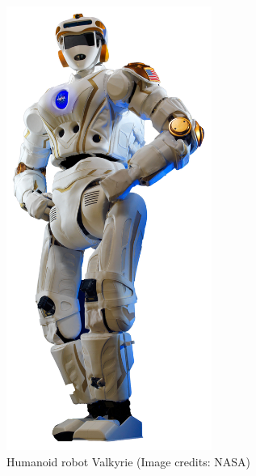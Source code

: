 \begin{figure}
\begin{minipage}{0.5\textwidth}
\centering
\includegraphics[width=0.6\textwidth]{images/valkyrie/Valkyrie.jpg}
\caption{Humanoid robot Valkyrie (Image credits: NASA)}
\label{fig:valkyrie}
\end{minipage}
%
\hspace{0.5cm}
%
\begin{minipage}{0.5\textwidth}
\centering
{}


\end{minipage}
\end{figure}
